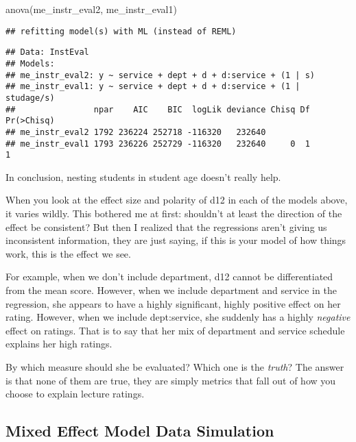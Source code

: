 \documentclass[
]{article}
\newenvironment{Shaded}{\begin{snugshade}}{\end{snugshade}}
\newcommand{\FunctionTok}[1]{\textcolor[rgb]{0.00,0.00,0.00}{#1}}
\newcommand{\NormalTok}[1]{#1}
\begin{document}
\begin{Shaded}
\begin{Highlighting}[]
\FunctionTok{anova}\NormalTok{(me\_instr\_eval2, me\_instr\_eval1)}
\end{Highlighting}
\end{Shaded}

\begin{verbatim}
## refitting model(s) with ML (instead of REML)
\end{verbatim}

\begin{verbatim}
## Data: InstEval
## Models:
## me_instr_eval2: y ~ service + dept + d + d:service + (1 | s)
## me_instr_eval1: y ~ service + dept + d + d:service + (1 | studage/s)
##                npar    AIC    BIC  logLik deviance Chisq Df Pr(>Chisq)
## me_instr_eval2 1792 236224 252718 -116320   232640                    
## me_instr_eval1 1793 236226 252729 -116320   232640     0  1          1
\end{verbatim}

In conclusion, nesting students in student age doesn't really help.

When you look at the effect size and polarity of d12 in each of the
models above, it varies wildly. This bothered me at first: shouldn't at
least the direction of the effect be consistent? But then I realized
that the regressions aren't giving us inconsistent information, they are
just saying, if this is your model of how things work, this is the
effect we see.

For example, when we don't include department, d12 cannot be
differentiated from the mean score. However, when we include department
and service in the regression, she appears to have a highly significant,
highly positive effect on her rating. However, when we include
dept:service, she suddenly has a highly \emph{negative} effect on
ratings. That is to say that her mix of department and service schedule
explains her high ratings.

By which measure should she be evaluated? Which one is the \emph{truth}?
The answer is that none of them are true, they are simply metrics that
fall out of how you choose to explain lecture ratings.

\hypertarget{mixed-effect-model-data-simulation}{%
\subsection{Mixed Effect Model Data
Simulation}\label{mixed-effect-model-data-simulation}}
\end{document}
